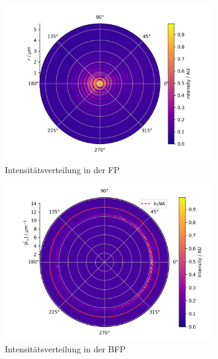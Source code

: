 \documentclass[titlepage,  ngerman]{article}
\begin{document}
	\begin{figure}
		\label{fig:example_measure}
		\centering
			\begin{subfigure}[b]{0.5\textwidth}
			\centering
			\includegraphics[width=\textwidth]{figures/fp/fp_0.png}
			\caption{Intensitätsverteilung in der FP}
			\label{fig:example_fp}		
		\end{subfigure}
		\begin{subfigure}[b]{0.49\textwidth}
			\centering
			\includegraphics[width=\textwidth]{figures/example_polar.png}
			\caption{Intensitätsverteilung in der BFP}
			\label{fig:example_bfp}		
		\end{subfigure}
		\begin{subfigure}[b]{0.5\textwidth}

\end{subfigure}
\end{figure}
\end{document}
